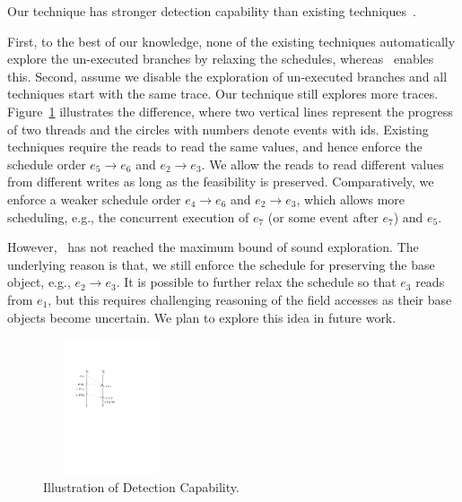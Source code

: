\begin{mydiscussion}
Our technique has stronger detection capability than existing techniques~\cite{yannis,pldi14,Said:2011}.
\end{mydiscussion}

First, to the best of our knowledge, none of the existing techniques 
automatically explore the un-executed branches by relaxing the schedules, whereas \tool\  enables this.
Second, assume we disable the exploration of un-executed branches and all 
techniques start with the same trace. Our technique still explores more 
traces. Figure~\ref{fig:discuss} illustrates the difference, where two 
vertical lines represent the progress of two threads and the circles 
with numbers denote events with ids. 
Existing techniques require the reads to read the same values, and hence
enforce the schedule order $e_5 \rightarrow e_6$ and $e_2\rightarrow e_3$. 
We allow the reads to read different values from different writes as long as 
the feasibility is preserved. Comparatively, we enforce a weaker 
schedule order  $e_4 \rightarrow e_6$ and $e_2\rightarrow e_3$, which 
allows more scheduling, e.g., the concurrent execution of $e_7$ (or 
some event after $e_7$) and $e_5$.

However, \tool\  has not reached the maximum bound of sound exploration.
The underlying reason is that, we still enforce the schedule for 
preserving the base object, e.g., $e_2\rightarrow e_3$. It is possible 
to further relax the schedule so that $e_3$ reads from $e_1$, but 
this requires challenging reasoning of the field accesses as their base 
objects become uncertain. We plan to explore this idea in future work.




\begin{figure}[htp]
\centering
\includegraphics[width=4cm,height=4cm]{figs/Visio-discuss.pdf}
\caption{Illustration of Detection Capability.}\label{fig:discuss}
\vspace{-2em}
\end{figure}




